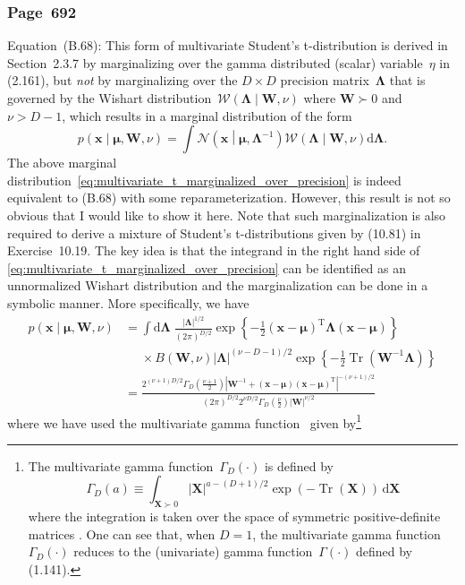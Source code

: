 \documentclass[12pt,a4paper]{article}
\newcommand{\erratum}[1]{%
\subsubsection*{#1}
\addcontentsline{toc}{subsection}{#1}}
\begin{document}
\erratum{Page~692}
Equation~(B.68):
This form of multivariate Student's t-distribution is derived in Section~2.3.7
by marginalizing over the gamma distributed (scalar) variable~$\eta$ in (2.161),
but \emph{not} by marginalizing over
the $D \times D$ precision matrix~$\bm{\Lambda}$ that is governed by
the Wishart distribution~$\mathcal{W}\left(\bm{\Lambda}\middle|\mathbf{W}, \nu\right)$
where $\mathbf{W} \succ 0$ and $\nu > D - 1$,
which results in a marginal distribution of the form
\begin{equation}
p\left(\mathbf{x}\middle|\bm{\mu}, \mathbf{W}, \nu\right) =
  \int \mathcal{N}\left(\mathbf{x}\middle|\bm{\mu}, \bm{\Lambda}^{-1}\right)
    \mathcal{W}\left(\bm{\Lambda}\middle|\mathbf{W}, \nu\right) \mathrm{d}\bm{\Lambda} .
\label{eq:multivariate_t_marginalized_over_precision}
\end{equation}
The above marginal distribution~\eqref{eq:multivariate_t_marginalized_over_precision} is indeed
equivalent to (B.68) with some reparameterization.
However, this result is not so obvious that I would like to show it here.
Note that such marginalization is also required to derive
a mixture of Student's t-distributions given by (10.81) in Exercise~10.19.
The key idea is that the integrand in the right hand side of
\eqref{eq:multivariate_t_marginalized_over_precision} can be identified as an unnormalized
Wishart distribution and the marginalization can be done in a symbolic manner.
More specifically, we have
\begin{align}
p\left(\mathbf{x}\middle|\bm{\mu}, \mathbf{W}, \nu\right)
&=
\int \mathrm{d}\bm{\Lambda} \; \frac{\left|\bm{\Lambda}\right|^{1/2}}{\left(2\pi\right)^{D/2}}
  \exp\left\{-\frac{1}{2}
    \left(\mathbf{x} - \bm{\mu}\right)^{\operatorname{T}}
    \bm{\Lambda}
    \left(\mathbf{x} - \bm{\mu}\right)
  \right\} \nonumber \\
&\phantom{=} \times
B\left(\mathbf{W}, \nu\right) \left|\bm{\Lambda}\right|^{(\nu - D - 1)/2}
  \exp\left\{
    -\frac{1}{2} \operatorname{Tr}\left( \mathbf{W}^{-1}\bm{\Lambda} \right)
  \right\}  \\
&=
\frac{
  2^{(\nu + 1)D/2} \Gamma_D \left(\frac{\nu + 1}{2}\right)
  \left| \mathbf{W}^{-1} +
    \left(\mathbf{x} - \bm{\mu}\right)\left(\mathbf{x} - \bm{\mu}\right)^{\operatorname{T}}
  \right|^{-(\nu + 1)/2}
}{
  \left(2\pi\right)^{D/2}
  2^{\nu D/2} \Gamma_D \left(\frac{\nu}{2}\right) \left|\mathbf{W}\right|^{\nu/2}
}
\end{align}
where we have used the multivariate gamma function~\citep{NIST:DLMF}
given by\footnote{The multivariate gamma function~$\Gamma_D (\cdot)$ is defined by
\begin{equation}
\Gamma_D (a) \equiv \int_{\mathbf{X} \succ 0}
\left|\mathbf{X}\right|^{a - (D + 1)/2} \exp(-\operatorname{Tr}(\mathbf{X}))
\,\mathrm{d}\mathbf{X}
\label{eq:multivariate_gamma_definition}
\end{equation}
where the integration is taken over the space of symmetric positive-definite matrices
\citep{NIST:DLMF}.
One can see that, when $D=1$, the multivariate gamma function~$\Gamma_D (\cdot)$ reduces to
the (univariate) gamma function~$\Gamma(\cdot)$ defined by (1.141).}
\end{document}

